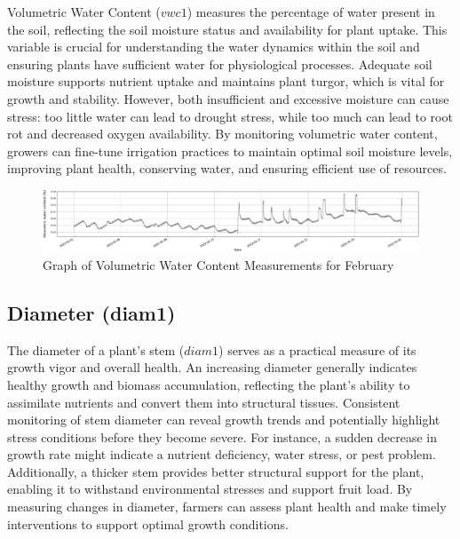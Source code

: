 Volumetric Water Content (\( vwc1 \)) measures the percentage of water present in the soil, reflecting the soil moisture status and availability for plant uptake. This variable is crucial for understanding the water dynamics within the soil and ensuring plants have sufficient water for physiological processes. Adequate soil moisture supports nutrient uptake and maintains plant turgor, which is vital for growth and stability. However, both insufficient and excessive moisture can cause stress: too little water can lead to drought stress, while too much can lead to root rot and decreased oxygen availability. By monitoring volumetric water content, growers can fine-tune irrigation practices to maintain optimal soil moisture levels, improving plant health, conserving water, and ensuring efficient use of resources.

\begin{figure}[htbp]
    \centering
    \includegraphics[width=15 cm]{4_ChapterMaterials/figuras/train_data_Volumetric_water_content.pdf}
    \caption{Graph of Volumetric Water Content Measurements for February}
    \end{figure}

\subsection{Diameter (diam1)}

The diameter of a plant's stem (\( diam1 \)) serves as a practical measure of its growth vigor and overall health. An increasing diameter generally indicates healthy growth and biomass accumulation, reflecting the plant's ability to assimilate nutrients and convert them into structural tissues. Consistent monitoring of stem diameter can reveal growth trends and potentially highlight stress conditions before they become severe. For instance, a sudden decrease in growth rate might indicate a nutrient deficiency, water stress, or pest problem. Additionally, a thicker stem provides better structural support for the plant, enabling it to withstand environmental stresses and support fruit load. By measuring changes in diameter, farmers can assess plant health and make timely interventions to support optimal growth conditions.

